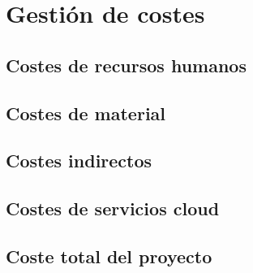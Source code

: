 \section{Gestión de costes}


\subsection{Costes de recursos humanos}


\subsection{Costes de material}


\subsection{Costes indirectos}


\subsection{Costes de servicios cloud}



\subsection{Coste total del proyecto}



